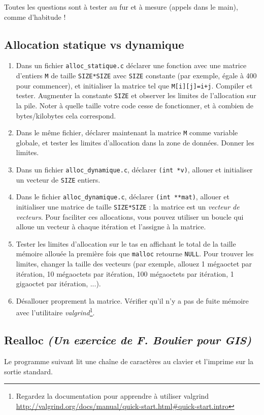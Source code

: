 \documentclass[final, pdftex, a4paper, openbib, ]{article}
\begin{document}
Toutes les questions sont à tester au fur et à mesure (appels dans le main), comme d'habitude !


\subsection{Allocation statique vs dynamique}
\begin{enumerate}
	\item Dans un fichier \texttt{alloc\_statique.c} déclarer une fonction avec une matrice d'entiers \texttt{M} de taille \texttt{SIZE*SIZE} avec \texttt{SIZE} constante (par exemple, égale à 400 pour commencer), et initialiser la matrice tel que \texttt{M[i][j]=i+j}.
	Compiler et tester. Augmenter la constante \texttt{SIZE} et observer les limites de l'allocation sur la pile.
	Noter à quelle taille votre code cesse de fonctionner, et à combien de bytes/kilobytes cela correspond.
	\item Dans le même fichier, déclarer maintenant la matrice \texttt{M} comme variable globale, et tester les limites d'allocation dans la zone de données. Donner les limites.
	\item Dans un fichier \texttt{alloc\_dynamique.c}, déclarer \texttt{(int *v)}, allouer et initialiser un vecteur de \texttt{SIZE} entiers.
	\item Dans le fichier \texttt{alloc\_dynamique.c}, déclarer \texttt{(int **mat)}, allouer et initialiser une matrice de taille \texttt{SIZE*SIZE} : la matrice est un \textit{vecteur de vecteurs}.
	Pour faciliter ces allocations, vous pouvez utiliser un boucle qui alloue un vecteur à chaque itération et l'assigne à la matrice.
	\item Tester les limites d'allocation sur le tas en affichant le total de la taille mémoire allouée la première
	fois que \texttt{malloc} retourne \texttt{NULL}.
	Pour trouver les limites, changer la taille des vecteurs (par exemple, allouez 1 mégaoctet par itération, 10 mégaoctets par itération, 100 mégaoctets par itération, 1 gigaoctet par itération, ...).
	\item Désallouer proprement la matrice. Vérifier qu'il n'y a pas de fuite mémoire avec l'utilitaire \textit{valgrind}\footnote{Regardez la documentation pour apprendre à utiliser valgrind \url{http://valgrind.org/docs/manual/quick-start.html\#quick-start.intro}}.
\end{enumerate}

\pagebreak
\subsection{Realloc \small \textit{(Un exercice de F. Boulier pour GIS)}}
Le programme suivant lit une chaîne de caractères au clavier et l'imprime sur la sortie standard.
\end{document}
